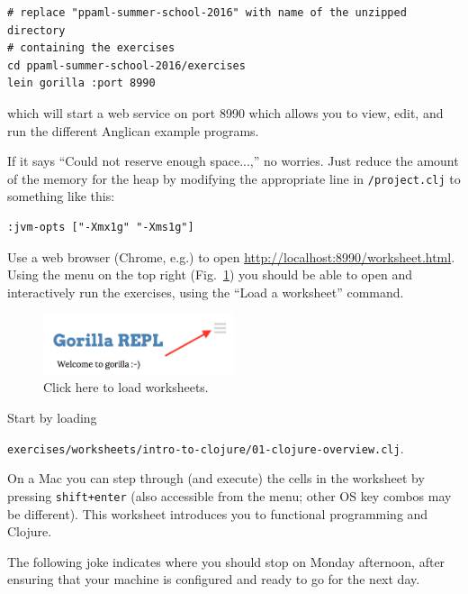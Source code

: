 \documentclass{article}
\begin{document}
\begin{verbatim}
# replace "ppaml-summer-school-2016" with name of the unzipped directory
# containing the exercises
cd ppaml-summer-school-2016/exercises
lein gorilla :port 8990
\end{verbatim}
which will start a web service on port 8990 which allows you to view, edit, and run
the different Anglican example programs.

\vspace{5mm}

\noindent If it says ``Could not reserve enough space...,'' no worries. Just reduce the amount of the memory for the heap by modifying the appropriate line in \texttt{/project.clj} to something like this:
\vspace{-2mm}
\begin{verbatim}
:jvm-opts ["-Xmx1g" "-Xms1g"] 
\end{verbatim}

\vspace{2mm}

\noindent Use a web browser (Chrome, e.g.) to open \url{http://localhost:8990/worksheet.html}.
Using the menu on the top right (Fig.~\ref{gorilla_hint}) you should be able to open and interactively run the exercises,
using the ``Load a worksheet'' command.

\begin{figure}[htbp]
\begin{center}
\includegraphics[width=0.5\textwidth]{gorilla_hint.png}
\caption{Click here to load worksheets.}
\label{gorilla_hint}
\end{center}
\end{figure}


Start by loading 

\texttt{exercises/worksheets/intro-to-clojure/01-clojure-overview.clj}.

On a Mac you can step through (and execute) the cells in the worksheet by pressing \texttt{shift+enter} (also accessible from the menu; other OS key combos may be different).  
This worksheet introduces you to functional programming and Clojure.

The following joke indicates where you should stop on Monday afternoon, after ensuring that your machine is configured and ready to go for the next day.
\end{document}
